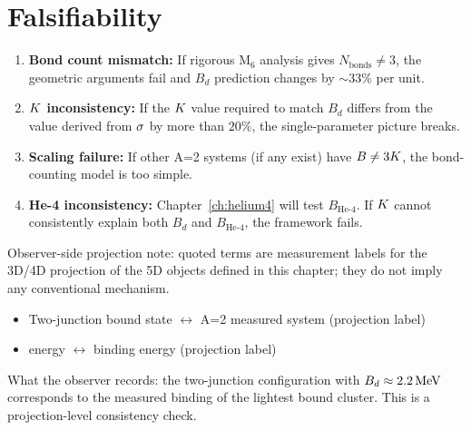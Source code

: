 \section{Falsifiability}
\label{sec:d:falsify}

\begin{edcopenbox}[title=Falsifiability Hooks]
    \begin{enumerate}
        \item \textbf{Bond count mismatch:} If rigorous M$_6$ analysis
              gives $N_{\text{bonds}} \neq 3$, the geometric arguments
              fail and $B_d$ prediction changes by $\sim 33\%$ per unit.

        \item \textbf{$K$ inconsistency:} If the $K$ value required
              to match $B_d$ differs from the value derived from $\sigma$
              by more than $20\%$, the single-parameter picture breaks.

        \item \textbf{Scaling failure:} If other A=2 systems (if any exist)
              have $B \neq 3K$, the bond-counting model is too simple.

        \item \textbf{He-4 inconsistency:} Chapter~\ref{ch:helium4} will
              test $B_{\text{He-4}}$. If $K$ cannot consistently
              explain both $B_d$ and $B_{\text{He-4}}$, the framework fails.
    \end{enumerate}
\end{edcopenbox}


\begin{observerbox}
Observer-side projection note: quoted terms are measurement labels for the
3D/4D projection of the 5D objects defined in this chapter; they do not
imply any conventional mechanism.

\begin{itemize}
    \item Two-junction bound state $\leftrightarrow$ A=2 measured system (projection label)
    \item \Pinning{} energy $\leftrightarrow$ binding energy (projection label)
\end{itemize}

What the observer records: the two-junction configuration with $B_d \approx 2.2\,\mathrm{MeV}$
corresponds to the measured binding of the lightest bound cluster. This is
a projection-level consistency check.
\end{observerbox}

